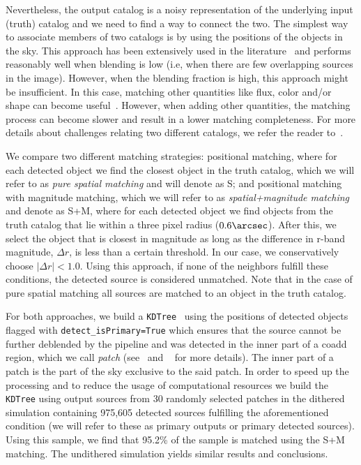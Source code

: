 \documentclass[\docopts]{\docclass}
\begin{document}
Nevertheless, the output catalog is a noisy representation of the underlying input (truth) catalog and we need to find a way to connect the two. 
The simplest way to associate members of two catalogs is by using the positions of the objects in the sky. This approach has been extensively used in the literature~\citep{1977A&AS...28..211D,1983Obs...103..150B,1986MNRAS.223..279W} and performs reasonably well when blending is low (i.e, when there are few overlapping sources in the image). However, when the blending fraction is high, this approach might be insufficient. In this case, matching other quantities like flux, color and/or shape can become useful~\citep{2008ApJ...679..301B, doi:10.1146/annurev-statistics-010814-020231}. However, when adding other quantities, the matching process can become slower and result in a lower matching completeness. For more details about challenges relating two different catalogs, we refer the reader to~\citet{doi:10.1146/annurev-statistics-010814-020231}. 

We compare two different matching strategies: positional matching, where for each detected object we find the closest object in the truth catalog, which we will refer to as \textit{pure spatial matching} and will denote as \textsf{S}; and positional matching with magnitude matching, which we will refer to as \textit{spatial+magnitude matching} and denote as \textsf{S+M}, where for each detected object we find objects from the truth catalog that lie within a three pixel radius ($0.6 \arcsec$). After this, we select the object that is closest in magnitude as long as the difference in r-band magnitude, $\Delta r$, is less than a certain threshold. In our case, we conservatively choose $|\Delta r| < 1.0$. Using this approach, if none of the neighbors fulfill these conditions, the detected source is considered unmatched. Note that in the case of pure spatial matching all sources are matched to an object in the truth catalog.

For both approaches, we build a \texttt{KDTree}~\citep{scikit-learn} using the positions of detected objects flagged with \texttt{detect\_isPrimary=True} which ensures that the source cannot be further deblended by the pipeline and was detected in the inner part of a coadd region, which we call \textit{patch} (see~\citet{2018PASJ...70S...5B} and ~\citet{2018PASJ...70S..25M} for more details). The inner part of a patch is the part of the sky exclusive to the said patch. In order to speed up the processing and to reduce the usage of computational resources we build the \texttt{KDTree} using output sources from 30 randomly selected patches in the dithered simulation containing 975,605 detected sources fulfilling the aforementioned condition (we will refer to these as primary outputs or primary detected sources). Using this sample, we find that 95.2\% of the sample is matched using the \textsf{S+M} matching. The undithered simulation yields similar results and conclusions. 
\end{document}
